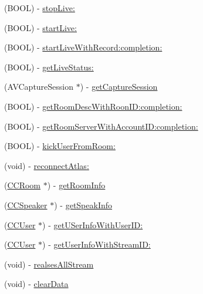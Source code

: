 \begin{DoxyCompactItemize}
\item 
(B\+O\+OL) -\/ \hyperlink{interface_c_c_streamer_basic_a1371108bb07a2af44edfda771ab62683}{stop\+Live\+:}
\item 
(B\+O\+OL) -\/ \hyperlink{interface_c_c_streamer_basic_ad9f91717c4dd487f254ace9a7237af4d}{start\+Live\+:}
\item 
(B\+O\+OL) -\/ \hyperlink{interface_c_c_streamer_basic_a1a7e5e90d65f3a07b6de817b120e6f2a}{start\+Live\+With\+Record\+:completion\+:}
\item 
(B\+O\+OL) -\/ \hyperlink{interface_c_c_streamer_basic_a572cf57c93623e0eaf87514737db5729}{get\+Live\+Status\+:}
\item 
(A\+V\+Capture\+Session $\ast$) -\/ \hyperlink{interface_c_c_streamer_basic_a0b681453aaf24a0424619fa488381313}{get\+Capture\+Session}
\item 
(B\+O\+OL) -\/ \hyperlink{interface_c_c_streamer_basic_a566714939c10eebc3def763308ad2e41}{get\+Room\+Desc\+With\+Roon\+I\+D\+:completion\+:}
\item 
(B\+O\+OL) -\/ \hyperlink{interface_c_c_streamer_basic_ac4a54455af6e7d3974a59892244df2df}{get\+Room\+Server\+With\+Account\+I\+D\+:completion\+:}
\item 
(B\+O\+OL) -\/ \hyperlink{interface_c_c_streamer_basic_ab32594777e441a8edf1f93b1135d9204}{kick\+User\+From\+Room\+:}
\item 
(void) -\/ \hyperlink{interface_c_c_streamer_basic_a67b341f9bc16e13c97c41543078d33f5}{reconnect\+Atlas\+:}
\item 
(\hyperlink{interface_c_c_room}{C\+C\+Room} $\ast$) -\/ \hyperlink{interface_c_c_streamer_basic_a3d9a24ed847067f8f71c815d5ce6c60e}{get\+Room\+Info}
\item 
(\hyperlink{interface_c_c_speaker}{C\+C\+Speaker} $\ast$) -\/ \hyperlink{interface_c_c_streamer_basic_a93ffb49f4b1a3cbbbeb89ec1927f60b7}{get\+Speak\+Info}
\item 
(\hyperlink{interface_c_c_user}{C\+C\+User} $\ast$) -\/ \hyperlink{interface_c_c_streamer_basic_aca867160cb49c555e62bd5b18e7ed279}{get\+U\+Ser\+Info\+With\+User\+I\+D\+:}
\item 
(\hyperlink{interface_c_c_user}{C\+C\+User} $\ast$) -\/ \hyperlink{interface_c_c_streamer_basic_ad0c98fb251203fb7531ecdabbe3ae84f}{get\+User\+Info\+With\+Stream\+I\+D\+:}
\item 
(void) -\/ \hyperlink{interface_c_c_streamer_basic_a1023b14df6914c3190d89c5cddbea14c}{realses\+All\+Stream}
\item 
(void) -\/ \hyperlink{interface_c_c_streamer_basic_ae3d13a9970f532c7bd630f98ecfc00bd}{clear\+Data}

\end{DoxyCompactItemize}
